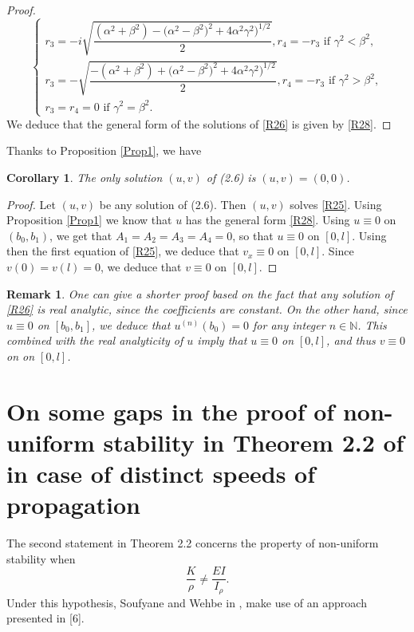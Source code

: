 \documentclass[10pt, english]{article}
\newtheorem{oss}[thm]{Remark}
\newtheorem{cor}[thm]{Corollary}
\begin{document}
{\begin{proof}
\begin{equation}
\end{equation}
\begin{equation}\label{R33}%
\begin{cases}
r_3=-i\sqrt{\dfrac{(\alpha^2+\beta^2)- \big(\alpha^2-\beta^2)^2 +4 \alpha^2 \gamma^2\big)^{1/2}}{2}}, r_4=-r_3 \mbox{ if }
\gamma^2 < \beta^2, \\
r_3=-\sqrt{\dfrac{-(\alpha^2+\beta^2)+ \big(\alpha^2-\beta^2)^2 +4 \alpha^2 \gamma^2\big)^{1/2}}{2}}, r_4=-r_3 \mbox{ if }
\gamma^2 > \beta^2, \\
r_3=r_4=0 \mbox{ if } \gamma^2 = \beta^2.
\end{cases}
\end{equation}
We deduce that the general form of the solutions of \eqref{R26} is given by \eqref{R28}.
\end{proof}
Thanks to Proposition  \ref{Prop1}, we have
\begin{cor}\label{Cor2}
The only solution $(u,v)$ of (2.6) is $(u,v)=(0,0)$.
\end{cor}
\begin{proof}
Let $(u,v)$ be any solution of (2.6). Then $(u,v)$ solves \eqref{R25}.
Using Proposition \ref{Prop1} we know that $u$ has the general form \eqref{R28}. Using $u\equiv 0$ on $(b_0,b_1)$, we get that $A_1=A_2=A_3=A_4=0$, so that $u \equiv 0$ on $[0,l]$. Using then the first equation of \eqref{R25}, we deduce that $v_x \equiv 0$ on $[0,l]$. Since $v(0)=v(l)=0$, we deduce that $v \equiv 0$ on $[0,l]$.
\end{proof}
\begin{oss}
One can give a shorter proof based on the fact that any solution of \eqref{R26} is real analytic, since the coefficients are constant. On the other hand, since $u \equiv 0$ on $[b_0,b_1]$, we deduce that $u^{(n)}(b_0)=0$ for any integer $n \in \mathbb{N}$. This combined with the real analyticity of $u$ imply that $u \equiv 0$ on $[0,l]$, and thus $v \equiv 0$ on on $[0,l]$.
\end{oss}

\section{On some gaps in the proof of non-uniform stability in Theorem 2.2 of \cite{SW2003} in case of distinct speeds of propagation}

The second statement in Theorem 2.2 concerns the property of non-uniform stability when 
\begin{equation}\label{DS}
\dfrac{K}{\rho} \neq \dfrac{EI}{I_{\rho}}.
\end{equation}
Under this hypothesis, Soufyane and Wehbe in \cite{SW2003},  make use of an approach presented in [6]. 

}
\end{document}
